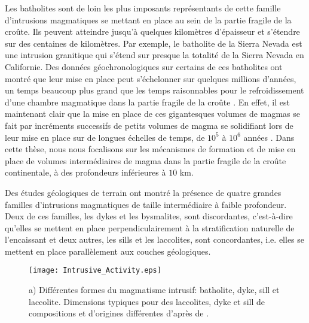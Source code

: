 Les batholites sont de loin  les plus imposants représentants de cette
famille d'intrusions  magmatiques se  mettant en place  au sein  de la
partie fragile de  la croûte.  Ils peuvent  atteindre jusqu'à quelques
kilomètres d'épaisseur  et s'étendre sur des  centaines de kilomètres.
Par  exemple, le  batholite  de  la Sierra  Nevada  est une  intrusion
granitique qui s'étend sur presque la  totalité de la Sierra Nevada en
Californie.   Des  données  géochronologiques   sur  certains  de  ces
batholites ont  montré que  leur mise en  place peut  s'échelonner sur
quelques millions d'années, un temps beaucoup plus grand que les temps
raisonnables pour le refroidissement  d'une chambre magmatique dans la
partie fragile de  la croûte \citep{Glazner:2004gv}. En  effet, il est
maintenant clair que  la mise en place de ces  gigantesques volumes de
magmas se fait par incréments successifs de petits volumes de magma se
solidifiant lors  de leur  mise en  place sur  de longues  échelles de
temps,         de        $10^5$         à        $10^6$         années
\citep{Petford:2000cc,Glazner:2004gv}.   Dans cette  thèse, nous  nous
focalisons sur  les mécanismes  de formation  et de  mise en  place de
volumes intermédiaires  de magma dans  la partie fragile de  la croûte
continentale, à des profondeurs inférieures à $10$ km.

Des études  géologiques de  terrain ont montré  la présence  de quatre
grandes familles  d'intrusions magmatiques  de taille  intermédiaire à
faible profondeur.  Deux de ces familles, les dykes et les bysmalites,
sont  discordantes,   c'est-à-dire  qu'elles   se  mettent   en  place
perpendiculairement à  la stratification naturelle de  l'encaissant et
deux  autres,   les  sills  et  les   laccolites,  sont  concordantes,
i.e. elles se mettent en place parallèlement aux couches géologiques.

\begin{figure}[htpb]
  \begin{center}
    \graphicspath{ {/Users/thorey/Documents/These/Manuscript/Figure/Chapter1/} }
    \texttt{[image: Intrusive\_Activity.eps]}
    \caption{a) Différentes formes  du magmatisme intrusif: batholite,
      dyke,  sill   et  laccolite.    Dimensions  typiques   pour  des
      laccolites,  dyke   et  sill   de  compositions   et  d'origines
      différentes d'après de \citet{Cruden:tg}. }
    \label{C1-Dimension}
  \end{center}
\end{figure}


